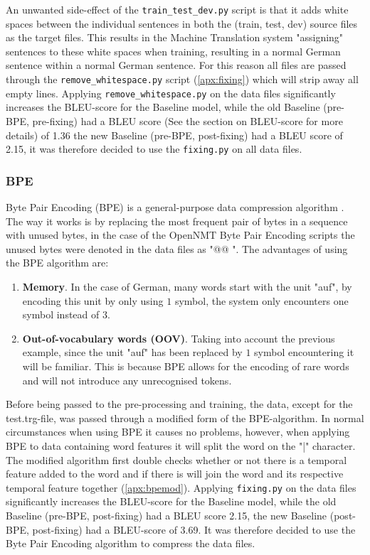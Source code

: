 An unwanted side-effect of the \texttt{train\_test\_dev.py} script is that it adds white spaces between the individual sentences in both the (train, test, dev) source files as the target files. This results in the Machine Translation system "assigning" sentences to these white spaces when training, resulting in a normal German sentence within a normal German sentence. For this reason all files are passed through the \texttt{remove\_whitespace.py} script (\autoref{apx:fixing}) which will strip away all empty lines. Applying \texttt{remove\_whitespace.py} on the data files significantly increases the BLEU-score for the Baseline model, while the old Baseline (pre-BPE, pre-fixing) had a BLEU score (See the section on BLEU-score for more details) of 1.36 the new Baseline (pre-BPE, post-fixing) had a BLEU score of 2.15, it was therefore decided to use the \texttt{fixing.py} on all data files.


\subsubsection{BPE}

Byte Pair Encoding (BPE) is a general-purpose data compression algorithm \cite{sennrich2015neural} \cite{gage1994new}. The way it works is by replacing the most frequent pair of bytes in a sequence with unused bytes, in the case of the OpenNMT Byte Pair Encoding \cite{klein-etal-2017-opennmt} scripts the unused bytes were denoted in the data files as "@@ ". The advantages of using the BPE algorithm are:

\begin{enumerate}
    \item \textbf{Memory}. In the case of German, many words start with the unit "auf", by encoding this unit by only using $1$ symbol, the system only encounters one symbol instead of $3$. \cite{gage1994new}
    \item \textbf{Out-of-vocabulary words (OOV)}. Taking into account the previous example, since the unit "auf" has been replaced by $1$ symbol encountering it will be familiar. This is because BPE allows for the encoding of rare words and will not introduce any unrecognised tokens. \cite{gage1994new} \cite{sennrich2015neural}
\end{enumerate}

Before being passed to the pre-processing and training, the data, except for the test.trg-file, was passed through a modified form of the BPE-algorithm. In normal circumstances when using BPE it causes no problems, however, when applying BPE to data containing word features it will split the word on the "|" character. The modified algorithm first double checks whether or not there is a temporal feature added to the word and if there is will join the word and its respective temporal feature together (\autoref{apx:bpemod}). Applying \texttt{fixing.py} on the data files significantly increases the BLEU-score for the Baseline model, while the old Baseline (pre-BPE, post-fixing) had a BLEU score 2.15, the new Baseline (post-BPE, post-fixing) had a BLEU-score of 3.69. It was therefore decided to use the Byte Pair Encoding algorithm to compress the data files.


